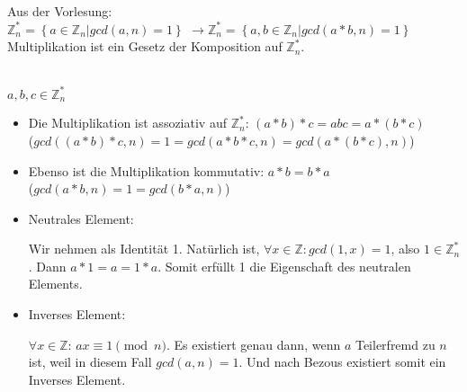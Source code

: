 \documentclass[12pt,pdftex,a4paper]{article}
\begin{document}
Aus der Vorlesung:\\
$ \mathds{Z}^*_n = \left\lbrace  a \in \mathds{Z}_n | gcd(a, n) = 1 \right\rbrace $
$ \rightarrow \mathds{Z}^*_n = \left\lbrace  a, b \in \mathds{Z}_n | gcd(a*b, n) = 1 \right\rbrace $\\
Multiplikation ist ein Gesetz der Komposition auf $ \mathds{Z}^*_n $.


~\\
$ a, b, c \in  \mathds{Z}^*_n $
\begin{itemize}
	\item Die Multiplikation ist assoziativ auf $ \mathds{Z}^*_n $:
	$ ( a * b ) * c =abc= a * ( b * c) $\\
	($ gcd((a*b)*c, n) = 1 = gcd(a*b*c, n) = gcd(a*(b*c), n) $)
	
	
	
	\item Ebenso ist die Multiplikation kommutativ: $ a*b = b*a $\\
	($ gcd(a*b, n) = 1 = gcd(b*a, n) $)
	
	
	
	\item Neutrales Element:
	
	Wir nehmen als Identität 1. Natürlich ist, $ \forall x \in  \mathds{Z} : gcd(1, x) = 1 $, also $ 1 \in \mathds{Z}^*_n $. Dann $ a * 1 = a = 1 * a $. Somit erfüllt 1 die Eigenschaft des neutralen Elements.
	
	
	
	\item Inverses Element: %
	
	$ \forall x \in  \mathds{Z} $: 
	$ ax \equiv 1 \pmod{n} $. Es existiert genau dann, wenn $ a $ Teilerfremd zu $ n $ ist, weil in diesem Fall $ gcd(a, n) = 1 $. Und nach Bezous existiert somit ein Inverses Element.
	 
\end{itemize}
\end{document}
